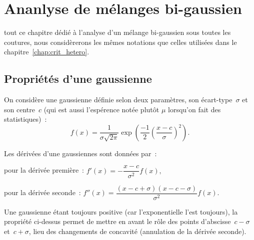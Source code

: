 \documentclass[main.tex]{subfiles}
\begin{document}
\chapter{Ananlyse de mélanges bi-gaussien \label{chap:anx_gmm}}
 tout ce chapitre dédié à l'analyse d'un mélange bi-gaussien sous toutes les coutures, nous considèrerons les mêmes notations que celles utilisées dans le chapitre~\ref{chap:crit_hetero}.

\section{Propriétés d'une gaussienne}
On considère une gaussienne définie selon deux paramètres, son écart-type~$\sigma$ et son centre~$c$ (qui est aussi l'espérence notée plutôt $\mu$ lorsqu'on fait des statistiques)~:
\begin{equation}
\label{eq:anxe_gaussienne}
f(x)=\dfrac{1}{\sigma \sqrt{2\pi}} \exp\left( \frac{-1}{2}  \left(  \dfrac{x-c}{\sigma} \right)^2  \right).
\end{equation}

\begin{prop}
Les dérivées d'une gaussiennes sont données par~:
\begin{myitemize}
\item pour la dérivée première~: $f'(x)= -\dfrac{x-c}{\sigma^2}f(x), $
\item pour la dérivée seconde~: $f''(x)= \dfrac{(x-c+\sigma)(x-c-\sigma)}{\sigma^2}f(x). $
\end{myitemize}
\end{prop}

Une gaussienne étant toujours positive (car l'exponentielle l'est toujours), la propriété ci-dessus permet de mettre en avant le rôle des points d'abscisse~$c-\sigma$ et~$c+\sigma$, lieu des changements de concavité (annulation de la dérivée seconde).
\end{document}
